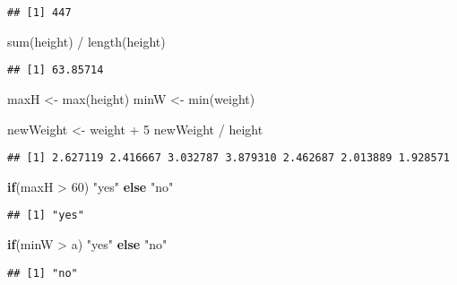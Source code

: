 \documentclass[
]{article}
\newenvironment{Shaded}{\begin{snugshade}}{\end{snugshade}}
\newcommand{\ControlFlowTok}[1]{\textcolor[rgb]{0.13,0.29,0.53}{\textbf{#1}}}
\newcommand{\DecValTok}[1]{\textcolor[rgb]{0.00,0.00,0.81}{#1}}
\newcommand{\FunctionTok}[1]{\textcolor[rgb]{0.00,0.00,0.00}{#1}}
\newcommand{\NormalTok}[1]{#1}
\newcommand{\OtherTok}[1]{\textcolor[rgb]{0.56,0.35,0.01}{#1}}
\newcommand{\SpecialCharTok}[1]{\textcolor[rgb]{0.00,0.00,0.00}{#1}}
\newcommand{\StringTok}[1]{\textcolor[rgb]{0.31,0.60,0.02}{#1}}
\begin{document}
\begin{verbatim}
## [1] 447
\end{verbatim}

\begin{Shaded}
\begin{Highlighting}[]
\FunctionTok{sum}\NormalTok{(height) }\SpecialCharTok{/} \FunctionTok{length}\NormalTok{(height)}
\end{Highlighting}
\end{Shaded}

\begin{verbatim}
## [1] 63.85714
\end{verbatim}

\begin{Shaded}
\begin{Highlighting}[]
\NormalTok{maxH }\OtherTok{\textless{}{-}} \FunctionTok{max}\NormalTok{(height)}
\NormalTok{minW }\OtherTok{\textless{}{-}} \FunctionTok{min}\NormalTok{(weight)}

\NormalTok{newWeight }\OtherTok{\textless{}{-}}\NormalTok{ weight }\SpecialCharTok{+} \DecValTok{5}
\NormalTok{newWeight }\SpecialCharTok{/}\NormalTok{ height}
\end{Highlighting}
\end{Shaded}

\begin{verbatim}
## [1] 2.627119 2.416667 3.032787 3.879310 2.462687 2.013889 1.928571
\end{verbatim}

\begin{Shaded}
\begin{Highlighting}[]
\ControlFlowTok{if}\NormalTok{(maxH }\SpecialCharTok{\textgreater{}} \DecValTok{60}\NormalTok{) }\StringTok{"yes"} \ControlFlowTok{else} \StringTok{"no"}
\end{Highlighting}
\end{Shaded}

\begin{verbatim}
## [1] "yes"
\end{verbatim}

\begin{Shaded}
\begin{Highlighting}[]
\ControlFlowTok{if}\NormalTok{(minW }\SpecialCharTok{\textgreater{}}\NormalTok{ a) }\StringTok{"yes"} \ControlFlowTok{else} \StringTok{"no"}
\end{Highlighting}
\end{Shaded}

\begin{verbatim}
## [1] "no"
\end{verbatim}
\end{document}
